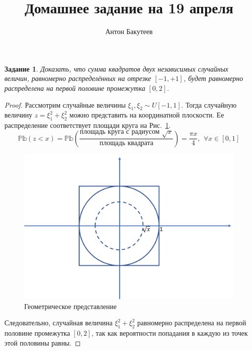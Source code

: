 \documentclass[10pt,a4paper]{article}
\author{Антон Бакутеев}
\title{Домашнее задание на 19 апреля}
\newcommand{\Pb}{\mathbb{Pb}}
\newtheorem{task}{Задание}
\begin{document}
	\maketitle
	\begin{task}
		Доказать, что сумма квадратов двух независимых случайных величин, равномерно распределённых на отрезке $[-1, +1]$, будет равномерно распределена на первой половине промежутка $[0, 2]$.
	\end{task}
	\begin{proof}
		Рассмотрим случайные величины $ \xi_1, \xi_2 \sim U[-1, 1] $. Тогда случайную величину $ z = \xi_1^2 + \xi_2^2 $ можно представить на координатной плоскости. Ее распределение соответствует площади круга на Рис.~\ref{fig:circle}.
		\[ \Pb(z < x)  = \Pb\left(\frac{\text{площадь круга с радиусом } \sqrt{x}}{\text{площадь квадрата}}\right) = \frac{\pi x}{4}, \hspace{5pt} \forall x\in[0, 1]\]
		\begin{figure}[h]
			\centering
			\includegraphics[width=0.7\linewidth]{circle}
			\caption{Геометрическое представление}
			\label{fig:circle}
		\end{figure}
		
		Следовательно, случайная величина $  \xi_1^2 + \xi_2^2 $ равномерно распределена на первой половине промежутка $[0, 2]$, так как вероятности попадания в каждую из точек этой половины равны.
	\end{proof}
\end{document}
